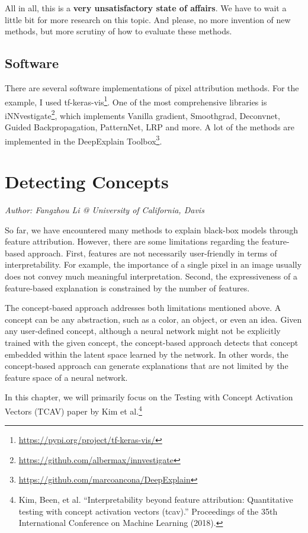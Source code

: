 \documentclass[12pt,]{krantz}
\renewcommand{\href}[2]{#2\footnote{\url{#1}}}
\begin{document}
All in all, this is a \textbf{very unsatisfactory state of affairs}. We
have to wait a little bit for more research on this topic. And please,
no more invention of new methods, but more scrutiny of how to evaluate
these methods.

\subsection{Software}\label{software-5}

There are several software implementations of pixel attribution methods.
For the example, I used
\href{https://pypi.org/project/tf-keras-vis/}{tf-keras-vis}. One of the
most comprehensive libraries is
\href{https://github.com/albermax/innvestigate}{iNNvestigate}, which
implements Vanilla gradient, Smoothgrad, Deconvnet, Guided
Backpropagation, PatternNet, LRP and more. A lot of the methods are
implemented in the
\href{https://github.com/marcoancona/DeepExplain}{DeepExplain Toolbox}.

\newpage

\section{Detecting Concepts}\label{detecting-concepts}

\emph{Author: Fangzhou Li @ University of California, Davis}

So far, we have encountered many methods to explain black-box models
through feature attribution. However, there are some limitations
regarding the feature-based approach. First, features are not
necessarily user-friendly in terms of interpretability. For example, the
importance of a single pixel in an image usually does not convey much
meaningful interpretation. Second, the expressiveness of a feature-based
explanation is constrained by the number of features.

The concept-based approach addresses both limitations mentioned above. A
concept can be any abstraction, such as a color, an object, or even an
idea. Given any user-defined concept, although a neural network might
not be explicitly trained with the given concept, the concept-based
approach detects that concept embedded within the latent space learned
by the network. In other words, the concept-based approach can generate
explanations that are not limited by the feature space of a neural
network.

In this chapter, we will primarily focus on the Testing with Concept
Activation Vectors (TCAV) paper by Kim et al.\footnote{Kim, Been, et al.
  ``Interpretability beyond feature attribution: Quantitative testing
  with concept activation vectors (tcav).'' Proceedings of the 35th
  International Conference on Machine Learning (2018).}
\end{document}
